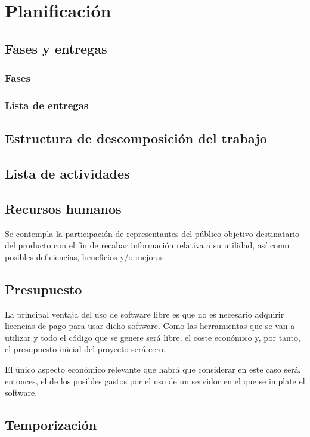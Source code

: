 \chapter{Planificación}
\label{cap:planificacion}

\section{Fases y entregas}

\subsection{Fases}

\subsection{Lista de entregas}

\section{Estructura de descomposición del trabajo}

\section{Lista de actividades}

\section{Recursos humanos}

Se contempla la participación de representantes del público objetivo destinatario del producto con el fin de recabar información relativa a su utilidad, así como posibles deficiencias, beneficios y/o mejoras.

\section{Presupuesto}

La principal ventaja del uso de software libre es que no es necesario adquirir licencias de pago para usar dicho software. Como las herramientas que se van a utilizar y todo el código que se genere será libre, el coste económico y, por tanto, el presupuesto inicial del proyecto será cero.

\bigskip

El único aspecto económico relevante que habrá que considerar en este caso será, entonces, el de los posibles gastos por el uso de un servidor en el que se implate el software.

\section{Temporización}
